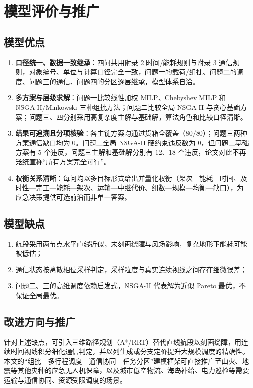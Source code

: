 \section{模型评价与推广}

\subsection{模型优点}
\begin{enumerate}[leftmargin=2em]
  \item \textbf{口径统一、数据一致继承}：四问共用附录 2 时间/能耗规则与附录 3 通信规则，对象编号、单位与计算口径完全一致，问题一的载荷/组批、问题二的调度、问题三的通信、问题四的分区逐层继承，模型体系自洽。
  \item \textbf{多方案与层级求解}：问题一比较线性加权 MILP、Chebyshev MILP 和 NSGA-II/Minkowski 三种组批方法；问题二比较全局 NSGA-II 与贪心基础方案；问题三、四分别采用高复杂度主解与基础解，算法角色和比较口径清晰。
  \item \textbf{结果可追溯且分项核验}：各主链方案均通过货箱全覆盖（$80/80$）；问题三两种方案通信缺口均为 $0$。问题二全局 NSGA-II 硬约束违反数为 $0$，但问题二基础方案有 $5$ 个违反，问题三主解和基础解分别有 $12$、$18$ 个违反，论文对此不再笼统宣称“所有方案完全可行”。
  \item \textbf{权衡关系清晰}：每问均以多目标形式给出并量化权衡（架次—能耗—时间、及时性—完工—能耗—架次、运输—中继代价、组数—规模—均衡—缺口），为应急决策提供可选前沿而非单一答案。
\end{enumerate}

\subsection{模型缺点}
\begin{enumerate}[leftmargin=2em]
  \item 航段采用两节点水平直线近似，未刻画绕障与风场影响，复杂地形下能耗可能被低估；
  \item 通信状态按离散相位采样判定，采样粒度与真实连续视线之间存在细微误差；
  \item 问题二、三的高维调度依赖启发式，NSGA-II 代表解为近似 Pareto 最优，不保证全局最优。
\end{enumerate}

\subsection{改进方向与推广}

针对上述缺点，可引入三维路径规划（A*/RRT）替代直线航段以刻画绕障，用连续时间视线积分细化通信判定，并以列生成或分支定价提升大规模调度的精确性。本文的“组批—多行程调度—通信协同—任务分区”建模框架可直接推广至山火、地震等其他灾种的应急无人机保障，以及城市低空物流、海岛补给、电力巡检等需要运输与通信协同、资源受限调度的场景。
